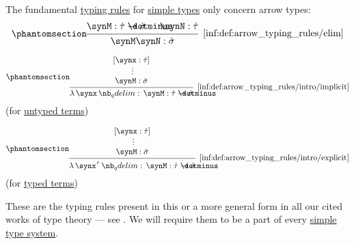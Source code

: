 \begin{definition}\label{def:arrow_typing_rules}
  The fundamental \hyperref[def:type_derivation_tree]{typing rules} for \hyperref[def:simple_type]{simple types} only concern arrow types:
  \begin{equation*}\taglabel[\ensuremath{ \rightarrow^- }]{inf:def:arrow_typing_rules/elim}
    \begin{prooftree}
      \hypo{ \synM: \syn\tau \synimplies \syn\sigma }
      \hypo{ \synN: \syn\tau }
      \infer2[\ref{inf:def:arrow_typing_rules/elim}]{ \synM \synN: \syn\sigma }
    \end{prooftree}
  \end{equation*}

  \begin{paracol}{2}
    \begin{leftcolumn}
      \centering
      \ParacolAlignmentHack
      \begin{equation*}\taglabel[\ensuremath{ \rightarrow^+ }]{inf:def:arrow_typing_rules/intro/implicit}
        \begin{prooftree}
          \hypo{ [\synx: \syn\tau] }
          \ellipsis {} { \synM: \syn\sigma }
          \infer1[\ref{inf:def:arrow_typing_rules/intro/implicit}]{ \qabs \synx \synM: \syn\tau \synimplies \syn\sigma }
        \end{prooftree}
      \end{equation*}
      (for \hyperref[def:lambda_term]{untyped terms})\phantom{\( \rightarrow^+ \)}
    \end{leftcolumn}

    \begin{rightcolumn}
      \centering
      \ParacolAlignmentHack
      \begin{equation*}\taglabel[\ensuremath{ \rightarrow_{\T{tt}}^+ }]{inf:def:arrow_typing_rules/intro/explicit}
        \begin{prooftree}
          \hypo{ [\synx: \syn\tau] }
          \ellipsis {} { \synM: \syn\sigma }
          \infer1[\ref{inf:def:arrow_typing_rules/intro/explicit}]{ \qabs {\synx^{\syn\tau}} \synM: \syn\tau \synimplies \syn\sigma }
        \end{prooftree}
      \end{equation*}
      (for \hyperref[def:typed_lambda_term]{typed terms})\phantom{\( \rightarrow_\tau^+ \)}
    \end{rightcolumn}
  \end{paracol}
\end{definition}
\begin{comments}
  \item These are the typing rules present in this or a more general form in all our cited works of type theory --- see . We will require them to be a part of every \hyperref[def:simple_type_system]{simple type system}.
\end{comments}

